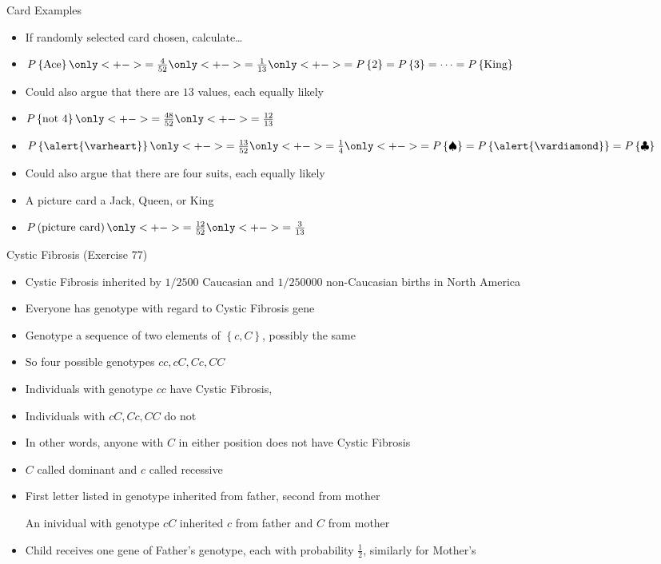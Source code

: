 \documentclass[handout]{beamer}
\theoremstyle{definition}
\begin{document}
\begin{frame}{Card Examples}
\begin{itemize}
\item If randomly selected card chosen, calculate\dots
\item $P\left\{\text{Ace}\right\}\only<+->{=\frac{4}{52}}
\only<+->{=\frac{1}{13}}
\only<+->{=P\left\{2\right\}=P\left\{3\right\}
=\cdots=P\left\{\text{King}\right\}}$
\item Could also argue that there are $13$ values, each equally likely
\item $P\left\{\text{not $4$}\right\}\only<+->{=\frac{48}{52}
\only<+->{=\frac{12}{13}}}$
\item $P\left\{\alert{\varheart}\right\}
\only<+->{=\frac{13}{52}}\only<+->{=\frac{1}{4}}
\only<+->{=P\left\{\spadesuit\right\}
=P\left\{\alert{\vardiamond}\right\}
=P\left\{\clubsuit\right\}}$
\item Could also argue that there are four suits, each equally likely
\item A \alert{picture card} a Jack, Queen, or King
\item $P\left(\text{picture card}\right)
\only<+->{=\frac{12}{52}}
\only<+->{=\frac{3}{13}}$
\end{itemize}
\end{frame}

\begin{frame}{Cystic Fibrosis (Exercise 77)}
\begin{itemize}
\item Cystic Fibrosis inherited by $1/2500$ Caucasian
and $1/250000$ non-Caucasian births in North America
\item Everyone has \alert{genotype}
with regard to Cystic Fibrosis gene
\item \alert{Genotype} a sequence of two elements of
$\left\{c,C\right\}$, possibly the same
\item So four possible genotypes $cc,cC,Cc,CC$
\item Individuals with genotype $cc$ \alert{have} Cystic Fibrosis,
\item Individuals with $cC,Cc,CC$ do \alert{not}
\item In other words, anyone with $C$ in either position
does \alert{not} have Cystic Fibrosis
\item $C$ called \alert{dominant} and $c$ called \alert{recessive}
\end{itemize}
\end{frame}

\begin{frame}
\begin{itemize}
\item First letter listed in genotype
inherited from father, second from mother
\begin{example}
An inividual with genotype $cC$ inherited
$c$ from father and $C$ from mother
\end{example}
\item Child receives one gene of Father's genotype,
each with probability $\frac{1}{2}$, similarly for Mother's
\end{itemize}
\end{frame}
\end{document}
